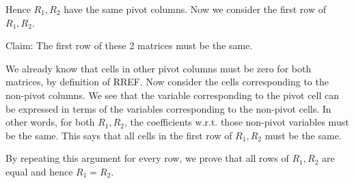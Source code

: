 \documentclass{article}
\begin{document}
Hence $R_1, R_2$ have the same pivot columns. Now we consider the first row of $R_1, R_2$.

Claim: The first row of these 2 matrices must be the same.

We already know that cells in other pivot columns must be zero for both matrices, by definition of RREF. Now consider the cells corresponding to the non-pivot columns. We see that the variable corresponding to the pivot cell can be expressed in terms of the variables corresponding to the non-pivot cells. In other words, for both $R_1, R_2$, the coefficients w.r.t. those non-pivot variables must be the same. This says that all cells in the first row of $R_1, R_2$ must be the same.

By repeating this argument for every row, we prove that all rows of $R_1, R_2$ are equal and hence $R_1 = R_2$.
\end{document}
